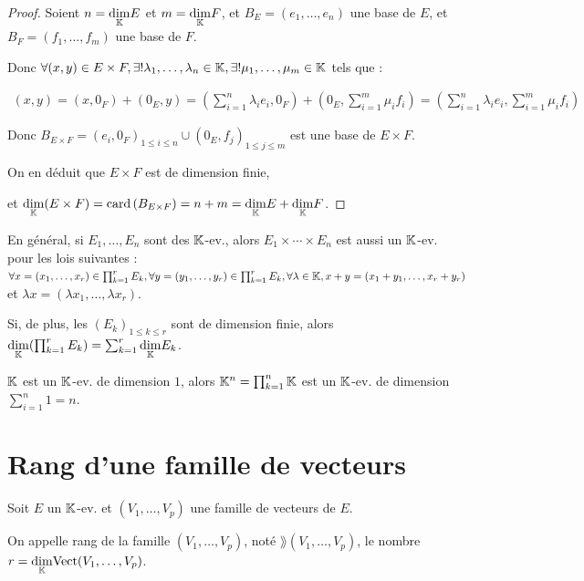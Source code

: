 \documentclass[12pt, a4paper]{report}
\begin{document}
\begin{proof}
    Soient $n = \underset{\mathbb{K}}\dim E$ et $m = \underset{\mathbb{K}}\dim F$, et $B_E = (e_1,\dots,e_n)$ une base de $E$, et $B_F = (f_1,\dots,f_m)$ une base de $F$.

    Donc $\forall (x,y) \in E\times F, \exists ! \lambda_1,\dots,\lambda_n \in \mathbb{K}, \exists ! \mu_1,\dots,\mu_m \in \mathbb{K}$ tels que :
    
    \begin{align*}
        (x,y) = (x,0_F) + (0_E,y) = (\sum_{i=1}^n \lambda_i e_i,0_F) + (0_E, \sum_{i=1}^m \mu_i f_i) = (\sum_{i=1}^n \lambda_i e_i, \sum_{i=1}^m \mu_i f_i)
    \end{align*}
    
    Donc $B_{E\times F} = (e_i,0_F)_{1\le i\le n} \cup (0_E,f_j)_{1\le j\le m}$ est une base de $E\times F$.

    On en déduit que $E\times F$ est de dimension finie,
    
    et $\underset{\mathbb{K}}\dim (E\times F) = \mathrm{card}\left(B_{E\times F}\right) = n + m = \underset{\mathbb{K}}\dim E + \underset{\mathbb{K}}\dim F$.
\end{proof}

\begin{remark}
    En général, si $E_1,\dots,E_n$ sont des $\mathbb{K}$-ev., alors
    $E_1 \times \cdots \times E_n$ est aussi un $\mathbb{K}$-ev. pour les lois suivantes :
    $\forall x = (x_1,\dots,x_r) \in \prod_{k=1}^r E_k, \forall y = (y_1,\dots,y_r) \in \prod_{k=1}^r E_k, \forall \lambda \in \mathbb{K}, x+y = (x_1+y_1,\dots,x_r+y_r)$ et $\lambda x = (\lambda x_1,\dots,\lambda x_r)$.

    Si, de plus, les $(E_k)_{1\le k \le r}$ sont de dimension finie, alors $\underset{\mathbb{K}}\dim (\prod_{k=1}^r E_k) = \sum_{k=1}^r \underset{\mathbb{K}}\dim E_k$.
\end{remark}

\begin{example}
    $\mathbb{K}$ est un $\mathbb{K}$-ev. de dimension $1$, alors $\mathbb{K}^n = \prod_{k=1}^n \mathbb{K}$ est un $\mathbb{K}$-ev. de dimension $\sum_{i=1}^n 1 = n$.
\end{example}

\section{Rang d'une famille de vecteurs}

\begin{definition}
    Soit $E$ un $\mathbb{K}$-ev. et $(V_1,\dots,V_p)$ une famille de vecteurs de $E$.

    On appelle rang de la famille $(V_1,\dots,V_p)$, noté $\rang(V_1,\dots,V_p)$, le nombre $r = \underset{\mathbb{K}}\dim \mathrm{Vect}(V_1,\dots,V_p)$.
\end{definition}
\end{document}
